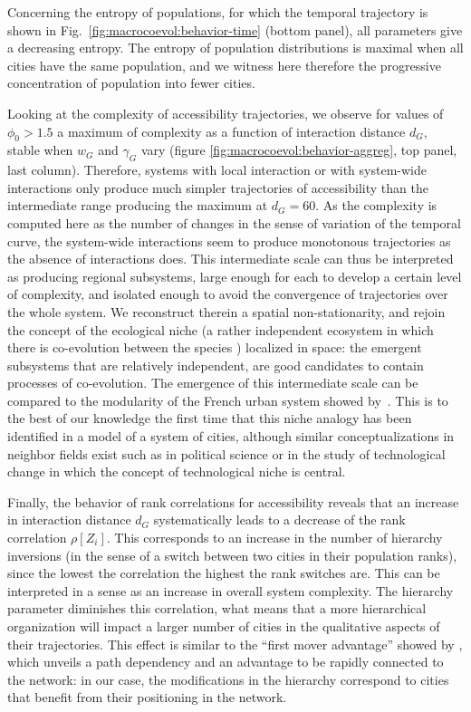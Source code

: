 \documentclass[11pt]{article}
\begin{document}
Concerning the entropy of populations, for which the temporal trajectory is shown in Fig.~\ref{fig:macrocoevol:behavior-time} (bottom panel), all parameters give a decreasing entropy. The entropy of population distributions is maximal when all cities have the same population, and we witness here therefore the progressive concentration of population into fewer cities.


Looking at the complexity of accessibility trajectories, we observe for values of $\phi_0 > 1.5$ a maximum of complexity as a function of interaction distance $d_G$, stable when $w_G$ and $\gamma_G$ vary (figure \ref{fig:macrocoevol:behavior-aggreg}, top panel, last column). Therefore, systems with local interaction or with system-wide interactions only produce much simpler trajectories of accessibility than the intermediate range producing the maximum at $d_G=60$. As the complexity is computed here as the number of changes in the sense of variation of the temporal curve, the system-wide interactions seem to produce monotonous trajectories as the absence of interactions does. This intermediate scale can thus be interpreted as producing regional subsystems, large enough for each to develop a certain level of complexity, and isolated enough to avoid the convergence of trajectories over the whole system. We reconstruct therein a spatial non-stationarity, and rejoin the concept of the ecological niche (a rather independent ecosystem in which there is co-evolution between the species \citep{holland2012signals}) localized in space: the emergent subsystems that are relatively independent, are good candidates to contain processes of co-evolution. The emergence of this intermediate scale can be compared to the modularity of the French urban system showed by~\cite{berroir2017systemes}. This is to the best of our knowledge the first time that this niche analogy has been identified in a model of a system of cities, although similar conceptualizations in neighbor fields exist such as in political science \citep{monstadt2009conceptualizing} or in the study of technological change \citep{geels2005processes} in which the concept of technological niche is central.



Finally, the behavior of rank correlations for accessibility reveals that an increase in interaction distance $d_G$ systematically leads to a decrease of the rank correlation $\rho \left[Z_i \right]$. This corresponds to an increase in the number of hierarchy inversions (in the sense of a switch between two cities in their population ranks), since the lowest the correlation the highest the rank switches are. This can be interpreted in a sense as an increase in overall system complexity. The hierarchy parameter diminishes this correlation, what means that a more hierarchical organization will impact a larger number of cities in the qualitative aspects of their trajectories. This effect is similar to the ``first mover advantage'' showed by \cite{levinson2011does}, which unveils a path dependency and an advantage to be rapidly connected to the network: in our case, the modifications in the hierarchy correspond to cities that benefit from their positioning in the network.
\end{document}
